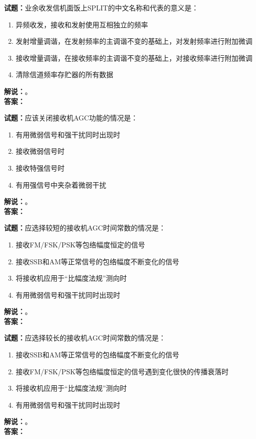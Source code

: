 \documentclass{ctexbook}
\begin{document}
\bigskip

\noindent\textbf{试题：}业余收发信机面饭上SPLIT的中文名称和代表的意义是：
\begin{enumerate}[leftmargin=3em]
  \item 异频收发，接收和发射使用互相独立的频率
  \item 发射增量调谐，在发射频率的主调谐不变的基础上，对发射频率进行附加微调
  \item 接收增量调谐，在接收频率的主调谐不变的基础上，对接收频率进行附加微调
  \item 清除信道频率存贮器的所有数据
\end{enumerate}
\noindent\textbf{解说：}\textbf{}。\\\noindent\textbf{答案：}

\bigskip

\noindent\textbf{试题：}应该关闭接收机AGC功能的情况是：
\begin{enumerate}[leftmargin=3em]
  \item 有用微弱信号和强干扰同时出现时
  \item 接收微弱信号时
  \item 接收特强信号时
  \item 有用强信号中夹杂着微弱干扰
\end{enumerate}
\noindent\textbf{解说：}\textbf{}。\\\noindent\textbf{答案：}

\bigskip

\noindent\textbf{试题：}应选择较短的接收机AGC时间常数的情况是：
\begin{enumerate}[leftmargin=3em]
  \item 接收FM/FSK/PSK等包络幅度恒定的信号
  \item 接收SSB和AM等正常信号的包络幅度不断变化的信号
  \item 将接收机应用于“比幅度法规”测向时
  \item 有用微弱信号和强干扰同时出现时
\end{enumerate}
\noindent\textbf{解说：}\textbf{}。\\\noindent\textbf{答案：}

\bigskip

\noindent\textbf{试题：}应选择较长的接收机AGC时间常数的情况是：
\begin{enumerate}[leftmargin=3em]
  \item 接收SSB和AM等正常信号的包络幅度不断变化的信号
  \item 接收FM/FSK/PSK等包络幅度恒定的信号遇到变化很快的传播衰落时
  \item 将接收机应用于“比幅度法规”测向时
  \item 有用微弱信号和强干扰同时出现时
\end{enumerate}
\noindent\textbf{解说：}\textbf{}。\\\noindent\textbf{答案：}
\end{document}
